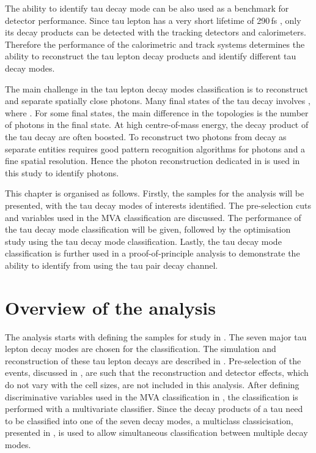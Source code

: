 The ability to identify tau decay mode can be also used as a benchmark for detector performance. Since tau lepton has a very short lifetime of 290\,fs \cite{Abreu:1991jn,Agashe:2014kda}, only its decay products can be detected with the tracking detectors and calorimeters. Therefore the performance of the calorimetric and track systems determines the ability to reconstruct the tau lepton decay products and identify different tau decay modes.

The main challenge in the tau lepton decay modes  classification is to reconstruct and separate spatially close photons. Many final states of the tau decay involves \Ppizero, where \HepProcess{\Ppizero \to \Pphoton \Pphoton}. For some final states, the main difference in the topologies is the number of photons in the final state. At high centre-of-mass energy, the decay product of the tau decay are often boosted.  To reconstruct two photons from \Ppizero decay as separate entities requires good pattern recognition algorithms for photons and a fine \ECAL spatial resolution. Hence the photon reconstruction dedicated in  is used in this study to identify photons.

This chapter is organised as follows. Firstly, the samples for the analysis will be presented, with the tau decay modes of interests identified. The pre-selection cuts and variables used in the MVA classification are discussed. The performance of the tau decay mode classification will be given, followed by the \ECAL optimisation study using the tau decay mode classification. Lastly, the  tau decay mode classification is further used in a proof-of-principle analysis to demonstrate the ability to identify \PHiggs from \PZ using the tau pair decay channel.

%



\section{Overview of the analysis}

The analysis starts with defining the samples for study in . The seven major tau lepton decay modes are chosen for the classification. The simulation and reconstruction of these tau lepton decays are described in .  Pre-selection of the events, discussed in , are such that the reconstruction and detector effects, which do not vary with the \ECAL cell sizes, are not included in this analysis. After defining discriminative variables used in the MVA classification in , the classification is performed with a multivariate classifier. Since the decay products of a tau need to be classified into one of the seven decay modes, a multiclass classicisation, presented in , is used to allow simultaneous classification between  multiple decay modes.

